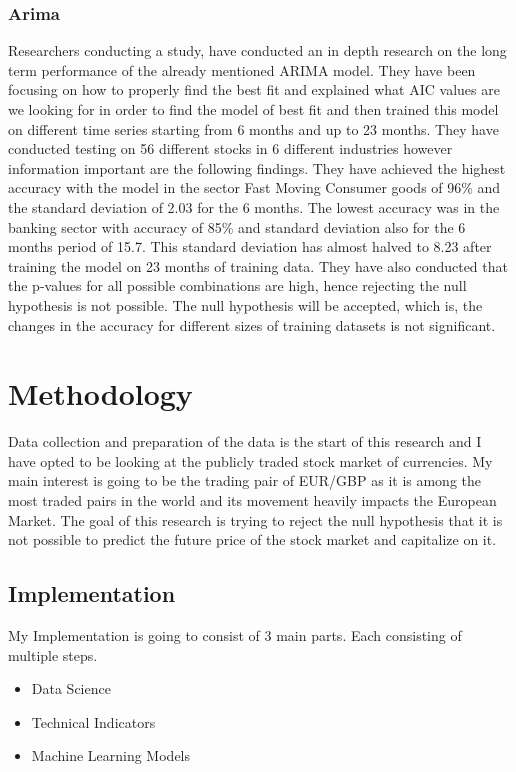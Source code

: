 \documentclass{imc-inf}
\begin{document}
	\subsection{Arima}
	Researchers conducting a study, \cite{arima} have conducted an in depth research on the long term performance of the already mentioned ARIMA model.
	They have been focusing on how to properly find the best fit and explained what AIC values are we looking for in order to find the model of best fit
	and then trained this model on different time series starting from 6 months and up to 23 months. They have conducted testing on 56 different stocks 
	in 6 different industries however information important are the following findings. They have achieved the highest accuracy with the model in the 
	sector Fast Moving Consumer goods of 96\% and the standard deviation of 2.03 for the 6 months. The lowest accuracy was in the banking sector with
	accuracy of 85\% and standard deviation also for the 6 months period of 15.7. This standard deviation has almost halved to 8.23 after training
	the model on 23 months of training data. They have also conducted that the p-values for all possible combinations are high, hence rejecting 
	the null hypothesis is not possible. The null hypothesis will be accepted, which is, the changes in the accuracy for different sizes of training
	datasets is not significant.
	
	\chapter{Methodology}\label{chap:methodology}
	Data collection and preparation of the data is the start of this research and I have opted to be looking at the publicly traded stock market of currencies.
	My main interest is going to be the trading pair of EUR/GBP as it is among the most traded pairs in the world and its movement heavily impacts the European Market.
	The goal of this research is trying to reject the null hypothesis that it is not possible to predict the future price of the stock market and capitalize on it. 
	
	\section{Implementation}
	My Implementation is going to consist of 3 main parts. Each consisting of multiple steps.
	\begin{itemize}
		\item Data Science
		\item Technical Indicators
		\item Machine Learning Models
	\end{itemize}
	
\end{document}
